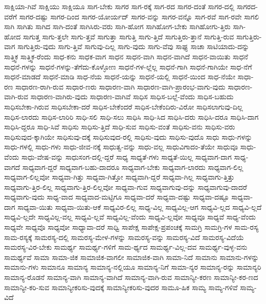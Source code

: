 {ಸಾಕ್ಷಿಯಾ-ಗಿವೆ
ಸಾಕ್ಷಿಯು
ಸಾಕ್ಷಿಯೂ
ಸಾಗ-ಬೇಕು
ಸಾಗರ
ಸಾಗ-ರಕ್ಕೆ
ಸಾಗ-ರದ
ಸಾಗರ-ದಂತೆ
ಸಾಗರ-ದಲ್ಲಿ
ಸಾಗರದ-ವರೆಗೆ
ಸಾಗರ-ದಷ್ಟು
ಸಾಗರ-ದಿಂದ
ಸಾಗರ-ಯೋರ್ಯದ್
ಸಾಗರ-ವನ್ನು
ಸಾಗರ-ವನ್ನೊ
ಸಾಗ-ರವೆ
ಸಾಗ-ರವೇ
ಸಾಗಲಿ
ಸಾಗಿ
ಸಾಗಿತು
ಸಾಗಿದ
ಸಾಗಿ-ದಂತೆ
ಸಾಗಿಸಿರು-ವರು
ಸಾಗಿ-ಹೋಗ
ಸಾಗಿಹೋಗ-ಬೇಕು
ಸಾಗಿಹೋಗು-ತ್ತಿರು
ಸಾಗಿ-ಹೋದ
ಸಾಗುತ್ತ
ಸಾಗು-ತ್ತಲೇ
ಸಾಗು-ತ್ತವೆ
ಸಾಗುತ್ತಾ
ಸಾಗುತ್ತಿ
ಸಾಗು-ತ್ತಿದೆ
ಸಾಗುತ್ತಿರು-ತ್ತಾನೆ
ಸಾಗುತ್ತಿ-ರುವ
ಸಾಗುತ್ತಿರು-ವಾಗ
ಸಾಗುತ್ತಿರು-ವುದು
ಸಾಗು-ತ್ತಿವೆ
ಸಾಗುವು-ದಿಲ್ಲ
ಸಾಗು-ವುದು
ಸಾಗು-ವೆವು
ಸಾಘ್ಯ
ಸಾಚಾ
ಸಾಟಿಯಾದು-ದನ್ನು
ಸಾತ್ತ್ವಿಕ
ಸಾತ್ತ್ವಿಕ-ರೆಂದು
ಸಾಧ-ಕನು
ಸಾಧಕ-ವಾಗ
ಸಾಧನ
ಸಾಧನ-ವಾಗಿ
ಸಾಧನ-ವಾಗಿದೆ
ಸಾಧನ-ವಾಯಿತು
ಸಾಧನೆ
ಸಾಧನೆ-ಗಳನ್ನು
ಸಾಧನೆ-ಗಳನ್ನು-ತೆಗೆದು-ಕೊಳ್ಳೋಣ
ಸಾಧನೆ-ಗಳ-ಲ್ಲೆಲ್ಲ
ಸಾಧನೆ-ಗಾಗಿ
ಸಾಧನೆ-ಗಾಗಿಯೇ
ಸಾಧ-ನೆಗೆ
ಸಾಧನೆ-ಮಾಡದೆ
ಸಾಧನೆ-ಮಾಡಿ
ಸಾಧ-ನೆಯ
ಸಾಧನೆ-ಯನ್ನು
ಸಾಧನೆ-ಯಲ್ಲಿ
ಸಾಧನೆ-ಯಿಂದ
ಸಾಧ-ನೆಯೇ
ಸಾಧಾ-ರಣ
ಸಾಧಾರಣ-ರಾಗಿ-ರುವ
ಸಾಧಾರ-ಣರು
ಸಾಧಾರಣ-ವಾಗಿ
ಸಾಧಾರಣ-ವಾಗಿ-ಪ್ರಾರಂಭ-ವಾಗು-ವುದು
ಸಾಧಾರಣ-ವಾಗಿ-ರುವ
ಸಾಧಾರಣ-ವಾಗಿರು-ವುದು
ಸಾಧಾರಣ-ವಾಗಿವೆ
ಸಾಧಿಸ
ಸಾಧಿಸ-ಬಲ್ಲೆ-ವೆಂದು
ಸಾಧಿಸ-ಬಹುದು
ಸಾಧಿಸಬೇಕಾ-ಗಿರುವ
ಸಾಧಿಸಬೇಕಾ-ದರೆ
ಸಾಧಿಸ-ಬೇಕೆಂದರೆ
ಸಾಧಿಸ-ಬೇಕೆಂದಿರು-ವಿರೋ
ಸಾಧಿಸಲಾಗುವು-ದಿಲ್ಲ
ಸಾಧಿಸ-ಲಾರದು
ಸಾಧಿಸ-ಲಾರಿರಿ
ಸಾಧಿ-ಸಲಿ
ಸಾಧಿ-ಸಲು
ಸಾಧಿಸಿ
ಸಾಧಿ-ಸಿದ
ಸಾಧಿಸಿ-ದರು
ಸಾಧಿಸಿ-ದರೂ
ಸಾಧಿಸಿ-ದಾಗ
ಸಾಧಿಸಿ-ದ್ದರೂ
ಸಾಧಿ-ಸಿವೆ
ಸಾಧಿಸು
ಸಾಧಿಸು-ತ್ತಿದೆ
ಸಾಧಿ-ಸುವ
ಸಾಧಿಸು-ವಂತೆ
ಸಾಧಿಸು-ವನು
ಸಾಧಿಸು-ವರು
ಸಾಧಿಸುವುದ-ಕ್ಕಾಗಿಯೇ
ಸಾಧಿಸುವು-ದಕ್ಕೆ
ಸಾಧಿಸುವುದ-ರಲ್ಲಿ
ಸಾಧಿಸು-ವುದು
ಸಾಧಿಸು-ವುದೊ
ಸಾಧು
ಸಾಧು-ಗಳನ್ನು
ಸಾಧು-ಗಳಲ್ಲಿ
ಸಾಧು-ಗಳು
ಸಾಧು-ಜೀವ-ನಕ್ಕೆ
ಸಾಧುತ್ವ-ವನ್ನು
ಸಾಧು-ವಲ್ಲ
ಸಾಧುವಿಗಾದಂ-ತೆಯೇ
ಸಾಧುವೂ
ಸಾಧು-ವೆಂದು
ಸಾಧು-ವೇಷ-ವನ್ನು
ಸಾಧುಸಂಗ-ದಲ್ಲಿ-ದ್ದರೆ
ಸಾಧ್ಯ
ಸಾಧ್ಯತೆ-ಗಳು
ಸಾಧ್ಯತೆ-ಯಿಲ್ಲ
ಸಾಧ್ಯವಾಗ-ದಾಗ
ಸಾಧ್ಯ-ವಾಗದೆ
ಸಾಧ್ಯವಾಗ-ದ್ದರೆ
ಸಾಧ್ಯವಾಗ-ಬಹು-ದಾದರೂ
ಸಾಧ್ಯವಾಗ-ಬೇಕು
ಸಾಧ್ಯವಾಗ-ಲಾರದು
ಸಾಧ್ಯವಾಗ-ಲಿಲ್ಲ
ಸಾಧ್ಯವಾಗ-ಲಿಲ್ಲವೋ
ಸಾಧ್ಯವಾ-ಗಿತ್ತು
ಸಾಧ್ಯವಾ-ಗಿತ್ತೋ
ಸಾಧ್ಯವಾಗಿ-ದ್ದರೆ
ಸಾಧ್ಯವಾ-ಗಿಲ್ಲ
ಸಾಧ್ಯವಾಗು-ತ್ತಿತ್ತು
ಸಾಧ್ಯವಾಗು-ತ್ತಿರ-ಲಿಲ್ಲ
ಸಾಧ್ಯವಾಗು-ತ್ತಿರ-ಲಿಲ್ಲವೋ
ಸಾಧ್ಯವಾ-ಗುವ
ಸಾಧ್ಯವಾಗುವು-ದನ್ನು
ಸಾಧ್ಯವಾಗುವು-ದಾದರೆ
ಸಾಧ್ಯವಾಗು-ವುದು
ಸಾಧ್ಯ-ವಾದ
ಸಾಧ್ಯವಾದ-ಮಟ್ಟಿಗೂ
ಸಾಧ್ಯವಾ-ದರೆ
ಸಾಧ್ಯವಾ-ದಷ್ಟು
ಸಾಧ್ಯವಾ-ದಷ್ಟೂ
ಸಾಧ್ಯವಾ-ದಾಗ
ಸಾಧ್ಯವಾ-ಯಿತು
ಸಾಧ್ಯವಾ-ಯಿತು-ಆಕೆ
ಸಾಧ್ಯವಿರ-ಲಿಲ್ಲ
ಸಾಧ್ಯ-ವಿಲ್ಲ
ಸಾಧ್ಯವಿಲ್ಲ-ಆಗ
ಸಾಧ್ಯವಿ-ಲ್ಲದ
ಸಾಧ್ಯವಿ-ಲ್ಲದೆ
ಸಾಧ್ಯವಿ-ಲ್ಲದೇ
ಸಾಧ್ಯವಿಲ್ಲ-ವಲ್ಲ
ಸಾಧ್ಯವಿ-ಲ್ಲವೆ
ಸಾಧ್ಯವಿಲ್ಲ-ವೆಂದು
ಸಾಧ್ಯವಿ-ಲ್ಲವೋ
ಸಾಧ್ಯವೂ
ಸಾಧ್ಯವೆ
ಸಾಧ್ಯ-ವೆಂದು
ಸಾಧ್ಯವೇ
ಸಾಧ್ಯವೊ
ಸಾಧ್ಯವೋ
ಸಾಧ್ಯಾವಾ-ದರೆ
ಸಾಧ್ವಿ
ಸಾಪೇಕ್ಷ
ಸಾಪೇಕ್ಷ-ಪ್ರಪಂಚಕ್ಕೆ
ಸಾಮಗ್ರಿ
ಸಾಮಗ್ರಿ-ಗಳ
ಸಾಮ-ರಸ್ಯ
ಸಾಮ-ರಸ್ಯಕ್ಕೆ
ಸಾಮರಸ್ಯ-ದಲ್ಲಿ
ಸಾಮರಸ್ಯ-ಮೇಳ-ಗಳನ್ನು
ಸಾಮರಸ್ಯ-ವನ್ನು
ಸಾಮರಸ್ಯ-ವಿದೆ
ಸಾಮರಸ್ಯ-ವಿದೆಯೆ
ಸಾಮರಸ್ಯ-ವಿರ-ಬೇಕು
ಸಾಮರ್ಥ್ಯ
ಸಾಮರ್ಥ್ಯ-ಗಳಿಗೆ
ಸಾಮ-ರ್ಥ್ಯದ
ಸಾಮರ್ಥ್ಯ-ವಿಲ್ಲ-ದವ
ಸಾಮರ್ಥ್ಯ-ವುಳ್ಳ-ವನು
ಸಾಮರ್ಥ್ಯವೆ
ಸಾಮಾ
ಸಾಮಾ-ಜಿಕ
ಸಾಮಾಜಿಕ-ವಾಗಲೀ
ಸಾಮಾಜಿಕ-ವಾಗಿ
ಸಾಮಾ-ನಿದೆ
ಸಾಮಾನು
ಸಾಮಾನು-ಗಳನ್ನು
ಸಾಮಾನು-ಗಳು
ಸಾಮಾನೂ
ಸಾಮಾನ್ಯ
ಸಾಮಾನ್ಯ-ನಲ್ಲಿಯೂ
ಸಾಮಾನ್ಯ-ನಿಗೆ
ಸಾಮಾ-ನ್ಯರ
ಸಾಮಾನ್ಯ-ರನ್ನು
ಸಾಮಾನ್ಯರಿ
ಸಾಮಾನ್ಯ-ರೊಡನೆ
ಸಾಮಾನ್ಯ-ವಾಗಿ
ಸಾಮಾನ್ಯ-ವಾಗಿದೆ
ಸಾಮಾನ್ಯ-ವಾಗಿ-ರುವ
ಸಾಮಾನ್ಯೀ-ಕರಣ
ಸಾಮಾನ್ಯೀ-ಕರ-ಣದ
ಸಾಮಾನ್ಯೀ-ಕರಿ-ಸುವ
ಸಾಮಾನ್ಯೀಕರಿಸು-ವುದಕ್ಕೆ
ಸಾಮಾನ್ಯೀಕರಿಸು-ವುದರ
ಸಾಮೂ-ಹಿಕ
ಸಾಮ್ಯ
ಸಾಮ್ಯ-ಗಳಿವೆ
ಸಾಮ್ಯ-ವಿದೆ
}

